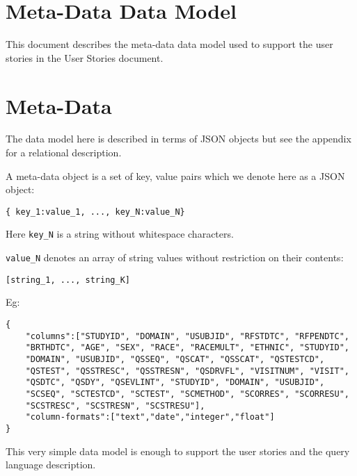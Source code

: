 \documentclass[11pt]{article}
\author{Vincent Toups}
\date{\today}
\title{}
\begin{document}
\tableofcontents

\section{Meta-Data Data Model}
\label{sec:orge357993}

This document describes the meta-data data model used to support the
user stories in the User Stories document.

\section{Meta-Data}
\label{sec:org75985a6}

The data model here is described in terms of JSON objects but see the
appendix for a relational description.

A meta-data object is a set of key, value pairs which we denote here
as a JSON object:

\begin{verbatim}
{ key_1:value_1, ..., key_N:value_N}
\end{verbatim}

Here \texttt{key\_N} is a string without whitespace characters.

\texttt{value\_N} denotes an array of string values without restriction on
their contents:

\begin{verbatim}
[string_1, ..., string_K]
\end{verbatim}

Eg:

\begin{verbatim}
{
    "columns":["STUDYID", "DOMAIN", "USUBJID", "RFSTDTC", "RFPENDTC",
    "BRTHDTC", "AGE", "SEX", "RACE", "RACEMULT", "ETHNIC", "STUDYID",
    "DOMAIN", "USUBJID", "QSSEQ", "QSCAT", "QSSCAT", "QSTESTCD",
    "QSTEST", "QSSTRESC", "QSSTRESN", "QSDRVFL", "VISITNUM", "VISIT",
    "QSDTC", "QSDY", "QSEVLINT", "STUDYID", "DOMAIN", "USUBJID",
    "SCSEQ", "SCTESTCD", "SCTEST", "SCMETHOD", "SCORRES", "SCORRESU",
    "SCSTRESC", "SCSTRESN", "SCSTRESU"],
    "column-formats":["text","date","integer","float"]
}
\end{verbatim}

This very simple data model is enough to support the user stories and
the query language description.
\end{document}
